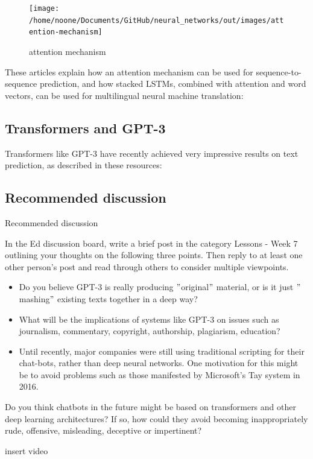 \documentclass[11pt]{article}
\begin{document}
\begin{figure}[h]
    \centering
    \texttt{[image: /home/noone/Documents/GitHub/neural\_networks/out/images/attention-mechanism]}
    \caption[attention mechanism]{attention mechanism}
    \label{fig:attention mechanism}
\end{figure}

These articles explain how an attention mechanism can be used for
sequence-to-sequence prediction, and how stacked LSTMs, combined with attention
and word vectors, can be used for multilingual neural machine translation:

\subsection{Transformers and GPT-3}\label{subsec:transformers-and-gpt-3}
Transformers like GPT-3 have recently achieved very impressive results on text
prediction, as described in these resources:

\subsection{Recommended discussion}\label{subsec:recommended-discussion}
Recommended discussion

In the Ed discussion board, write a brief post in the category Lessons - Week 7 outlining your thoughts on the following three points.
Then reply to at least one other person's post and read through others to consider multiple viewpoints.
\begin{itemize}
  \item Do you believe GPT-3 is really producing \("\)original\("\) material, or is it just \("\)mashing\("\) existing texts together in a deep way?
  \item What will be the implications of systems like GPT-3 on issues such as journalism, commentary, copyright, authorship, plagiarism, education?
  \item Until recently, major companies were still using traditional scripting for their chat-bots, rather than deep neural networks. One motivation for this might be to avoid problems such as those manifested by Microsoft's Tay system in 2016.
\end{itemize}

Do you think chatbots in the future might be based on transformers and other deep learning architectures?
If so, how could they avoid becoming inappropriately rude, offensive, misleading, deceptive or impertinent?

    insert video
\end{document}
